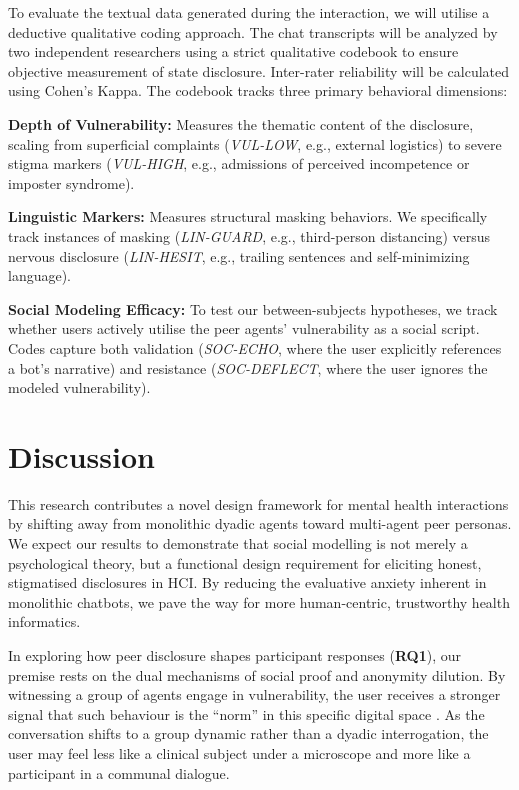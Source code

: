 \documentclass[sigconf]{acmart}
\begin{document}
To evaluate the textual data generated during the interaction, we will utilise a deductive qualitative coding approach. The chat transcripts will be analyzed by two independent researchers using a strict qualitative codebook to ensure objective measurement of state disclosure. Inter-rater reliability will be calculated using Cohen's Kappa. The codebook tracks three primary behavioral dimensions:

\textbf{Depth of Vulnerability:} Measures the thematic content of the disclosure, scaling from superficial complaints (\textit{VUL-LOW}, e.g., external logistics) to severe stigma markers (\textit{VUL-HIGH}, e.g., admissions of perceived incompetence or imposter syndrome).

\textbf{Linguistic Markers:} Measures structural masking behaviors. We specifically track instances of masking (\textit{LIN-GUARD}, e.g., third-person distancing) versus nervous disclosure (\textit{LIN-HESIT}, e.g., trailing sentences and self-minimizing language).

\textbf{Social Modeling Efficacy:} To test our between-subjects hypotheses, we track whether users actively utilise the peer agents' vulnerability as a social script. Codes capture both validation (\textit{SOC-ECHO}, where the user explicitly references a bot's narrative) and resistance (\textit{SOC-DEFLECT}, where the user ignores the modeled vulnerability).

\section{Discussion}

This research contributes a novel design framework for mental health interactions by shifting away from monolithic dyadic agents toward multi-agent peer personas. We expect our results to demonstrate that social modelling is not merely a psychological theory, but a functional design requirement for eliciting honest, stigmatised disclosures in HCI. By reducing the evaluative anxiety inherent in monolithic chatbots, we pave the way for more human-centric, trustworthy health informatics.

In exploring how peer disclosure shapes participant responses (\textbf{RQ1}), our premise rests on the dual mechanisms of social proof and anonymity dilution. By witnessing a group of agents engage in vulnerability, the user receives a stronger signal that such behaviour is the ``norm'' in this specific digital space \cite{Lugrin2021HandbookVol1, Lugrin2022HandbookVol2}. As the conversation shifts to a group dynamic rather than a dyadic interrogation, the user may feel less like a clinical subject under a microscope and more like a participant in a communal dialogue.
\end{document}
